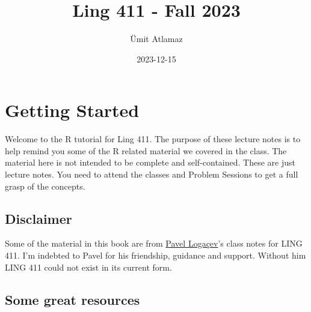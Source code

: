 \documentclass[
]{book}
\title{Ling 411 - Fall 2023}
\author{Ümit Atlamaz}
\date{2023-12-15}
\newenvironment{Shaded}{\begin{snugshade}}{\end{snugshade}}
\newcommand{\AttributeTok}[1]{\textcolor[rgb]{0.13,0.29,0.53}{#1}}
\newcommand{\CommentTok}[1]{\textcolor[rgb]{0.56,0.35,0.01}{\textit{#1}}}
\newcommand{\DecValTok}[1]{\textcolor[rgb]{0.00,0.00,0.81}{#1}}
\newcommand{\FunctionTok}[1]{\textcolor[rgb]{0.13,0.29,0.53}{\textbf{#1}}}
\newcommand{\NormalTok}[1]{#1}
\newcommand{\SpecialCharTok}[1]{\textcolor[rgb]{0.81,0.36,0.00}{\textbf{#1}}}
\newcommand{\StringTok}[1]{\textcolor[rgb]{0.31,0.60,0.02}{#1}}
\begin{document}
\maketitle

{
\setcounter{tocdepth}{1}
\tableofcontents
}
\begin{Shaded}
\end{Shaded}

\hypertarget{getting-started}{%
\chapter{Getting Started}\label{getting-started}}

Welcome to the R tutorial for Ling 411. The purpose of these lecture notes is to help remind you some of the R related material we covered in the class. The material here is not intended to be complete and self-contained. These are just lecture notes. You need to attend the classes and Problem Sessions to get a full grasp of the concepts.

\hypertarget{disclaimer}{%
\section{Disclaimer}\label{disclaimer}}

Some of the material in this book are from \href{https://scholar.google.com/citations?user=fhbdTJIAAAAJ\&hl=tr}{Pavel Logaçev}'s class notes for LING 411. I'm indebted to Pavel for his friendship, guidance and support. Without him LING 411 could not exist in its current form.

\hypertarget{some-great-resources}{%
\section{Some great resources}\label{some-great-resources}}
\end{document}
